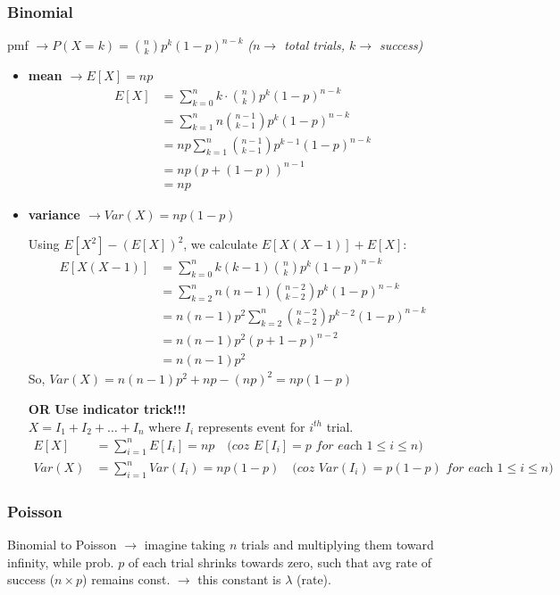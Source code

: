 \subsubsection{Binomial}
pmf $\rightarrow P(X=k) = \binom{n}{k} p^k (1-p)^{n-k}$ \quad \textit{($n \rightarrow$ total trials, $k \rightarrow$ success)}
\begin{itemize}
    \item \textbf{mean $\rightarrow E[X] = np$}
    \begin{align*}
        E[X] &= \sum_{k=0}^n k \cdot \binom{n}{k} p^k (1-p)^{n-k} \\
        &= \sum_{k=1}^n n \binom{n-1}{k-1} p^k (1-p)^{n-k} \\
        &= np \sum_{k=1}^n \binom{n-1}{k-1} p^{k-1} (1-p)^{n-k} \\
        &= np(p + (1-p))^{n-1} \\
        &= np
    \end{align*}
    \item \textbf{variance $\rightarrow Var(X) = np(1-p)$}
    
    Using $E[X^2] - (E[X])^2$, we calculate $E[X(X-1)] + E[X]$:
    \begin{align*}
        E[X(X-1)] &= \sum_{k=0}^n k(k-1) \binom{n}{k} p^k (1-p)^{n-k} \\
        &= \sum_{k=2}^n n(n-1) \binom{n-2}{k-2} p^k (1-p)^{n-k} \\
        &= n(n-1)p^2 \sum_{k=2}^n \binom{n-2}{k-2} p^{k-2} (1-p)^{n-k} \\
        &= n(n-1)p^2(p + 1-p)^{n-2} \\
        &= n(n-1)p^2
    \end{align*}
    So, $Var(X) = n(n-1)p^2 + np - (np)^2 = np(1-p)$

    \textbf{OR Use indicator trick!!!}
    \\ $X = I_1 + I_2 + \dots + I_n$ where $I_i$ represents event for $i^{th}$ trial.
    \begin{align*}
        E[X] &= \sum_{i=1}^n E[I_i] = np \quad \textit{(coz $E[I_i] = p$ for each $1 \leq i \leq n$)} \\
        Var(X) &= \sum_{i=1}^n Var(I_i) = np(1-p) \quad \textit{(coz $Var(I_i) = p(1-p)$ for each $1 \leq i \leq n$)}
    \end{align*}
\end{itemize}

\subsubsection{Poisson}
Binomial to Poisson $\rightarrow$ imagine taking $n$ trials and multiplying them toward infinity, while prob. $p$ of each trial shrinks towards zero, such that avg rate of success ($n \times p$) remains const. $\rightarrow$ this constant is $\lambda$ (rate).

